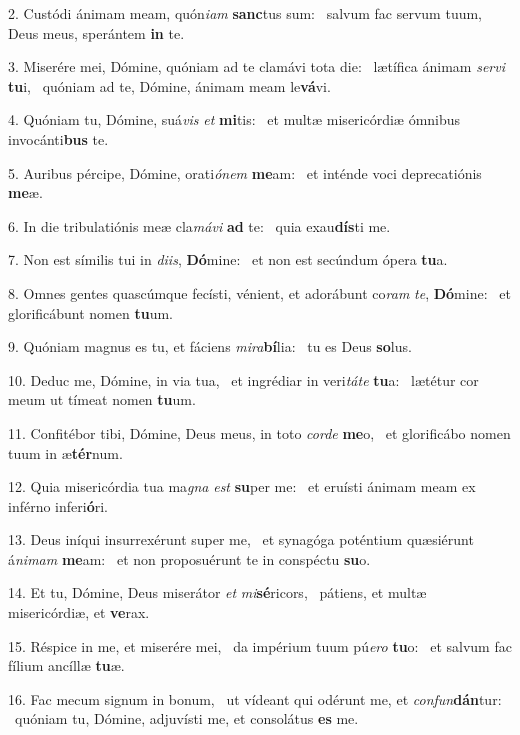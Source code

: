 2. Custódi ánimam meam, quón\textit{i}\textit{am} \textbf{sanc}tus sum: \ast\  salvum fac servum tuum, Deus meus, sperántem \textbf{in} te.\

3. Miserére mei, Dómine, quóniam ad te clamávi tota die: \dag\  lætífica ánimam \textit{ser}\textit{vi} \textbf{tu}i, \ast\  quóniam ad te, Dómine, ánimam meam le\textbf{vá}vi.\

4. Quóniam tu, Dómine, suá\textit{vis} \textit{et} \textbf{mi}tis: \ast\  et multæ misericórdiæ ómnibus invocánti\textbf{bus} te.\

5. Auribus pércipe, Dómine, orati\textit{ó}\textit{nem} \textbf{me}am: \ast\  et inténde voci deprecatiónis \textbf{me}æ.\

6. In die tribulatiónis meæ cla\textit{má}\textit{vi} \textbf{ad} te: \ast\  quia exau\textbf{dís}ti me.\

7. Non est símilis tui in \textit{di}\textit{is}, \textbf{Dó}mine: \ast\  et non est secúndum ópera \textbf{tu}a.\

8. Omnes gentes quascúmque fecísti, vénient, et adorábunt co\textit{ram} \textit{te}, \textbf{Dó}mine: \ast\  et glorificábunt nomen \textbf{tu}um.\

9. Quóniam magnus es tu, et fáciens \textit{mi}\textit{ra}\textbf{bí}lia: \ast\  tu es Deus \textbf{so}lus.\

10. Deduc me, Dómine, in via tua, \dag\  et ingrédiar in veri\textit{tá}\textit{te} \textbf{tu}a: \ast\  lætétur cor meum ut tímeat nomen \textbf{tu}um.\

11. Confitébor tibi, Dómine, Deus meus, in toto \textit{cor}\textit{de} \textbf{me}o, \ast\  et glorificábo nomen tuum in æ\textbf{tér}num.\

12. Quia misericórdia tua ma\textit{gna} \textit{est} \textbf{su}per me: \ast\  et eruísti ánimam meam ex inférno inferi\textbf{ó}ri.\

13. Deus iníqui insurrexérunt super me, \dag\  et synagóga poténtium quæsiérunt á\textit{ni}\textit{mam} \textbf{me}am: \ast\  et non proposuérunt te in conspéctu \textbf{su}o.\

14. Et tu, Dómine, Deus miserátor \textit{et} \textit{mi}\textbf{sé}ricors, \ast\  pátiens, et multæ misericórdiæ, et \textbf{ve}rax.\

15. Réspice in me, et miserére mei, \dag\  da impérium tuum pú\textit{e}\textit{ro} \textbf{tu}o: \ast\  et salvum fac fílium ancíllæ \textbf{tu}æ.\

16. Fac mecum signum in bonum, \dag\  ut vídeant qui odérunt me, et \textit{con}\textit{fun}\textbf{dán}tur: \ast\  quóniam tu, Dómine, adjuvísti me, et consolátus \textbf{es} me.\

